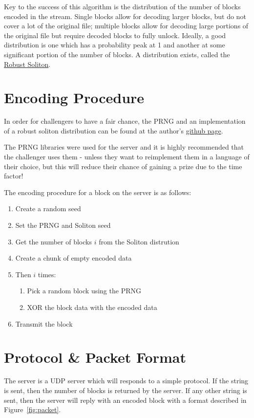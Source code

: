 \documentclass[10pt,a4paper]{article}
\begin{document}
Key to the success of this algorithm is the distribution of the number of blocks encoded in the stream.
Single blocks allow for decoding larger blocks, but do not cover a lot of the original file; multiple blocks allow for decoding large portions of the original file but require decoded blocks to fully unlock.
Ideally, a good distribution is one which has a probability peak at 1 and another at some significant portion of the number of blocks.
A distribution exists, called the \href{http://en.wikipedia.org/wiki/Soliton_distribution}{Robust Soliton}.

\section{Encoding Procedure}

In order for challengers to have a fair chance, the PRNG and an implementation of a robust soliton distribution can be found at the author's \href{http://github.com/carl-ellis/}{github page}.

The PRNG libraries were used for the server and it is highly recommended that the challenger uses them - unless they want to reimplement them in a language of their choice, but this will reduce their chance of gaining a prize due to the time factor!

The encoding procedure for a block on the server is as follows:

\begin{enumerate}
	\item Create a random seed
	\item Set the PRNG and Soliton seed
	\item Get the number of blocks $i$ from the Soliton distrution
	\item Create a chunk of empty encoded data
	\item Then $i$ times:
	\begin{enumerate}
		\item Pick a random block using the PRNG
		\item XOR the block data with the encoded data
	\end{enumerate}
	\item Transmit the block 
\end{enumerate}


\section{Protocol \& Packet Format}

The server is a UDP server which will responds to a simple protocol.
If the string  is sent, then the number of blocks is returned by the server.
If any other string is sent, then the server will reply with an encoded block with a format described in Figure~\ref{fig:packet}.
\end{document}
